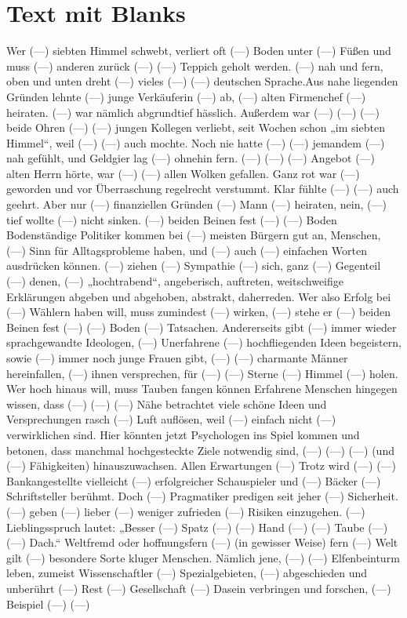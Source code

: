 \documentclass[14pt,a4paper]{extarticle}
\begin{document}
\section{Text mit Blanks}Wer (---) siebten Himmel schwebt, verliert oft (---) Boden unter (---) Füßen und muss (---) anderen zurück (---) (---) Teppich geholt werden. (---) nah und fern, oben und unten dreht (---) vieles (---) (---) deutschen Sprache.\newline\newline \newline\newline Aus nahe liegenden Gründen lehnte (---) junge Verkäuferin (---) ab, (---) alten Firmenchef (---) heiraten. (---) war nämlich abgrundtief hässlich. Außerdem war (---) (---) (---) beide Ohren (---) (---) jungen Kollegen verliebt, seit Wochen schon „im siebten Himmel“, weil (---) (---) auch mochte. Noch nie hatte (---) (---) jemandem (---) nah gefühlt, und Geldgier lag (---) ohnehin fern. (---) (---) (---) Angebot (---) alten Herrn hörte, war (---) (---) allen Wolken gefallen. Ganz rot war (---) geworden und vor Überraschung regelrecht verstummt. Klar fühlte (---) (---) auch geehrt. Aber nur (---) finanziellen Gründen (---) Mann (---) heiraten, nein, (---) tief wollte (---) nicht sinken.  (---) beiden Beinen fest (---) (---) Boden  Bodenständige Politiker kommen bei (---) meisten Bürgern gut an, Menschen, (---) Sinn für Alltagsprobleme haben, und (---) auch (---) einfachen Worten ausdrücken können. (---) ziehen (---) Sympathie (---) sich, ganz (---) Gegenteil (---) denen, (---) „hochtrabend“, angeberisch, auftreten, weitschweifige Erklärungen abgeben und abgehoben, abstrakt, daherreden. Wer also Erfolg bei (---) Wählern haben will, muss zumindest (---) wirken, (---) stehe er (---) beiden Beinen fest (---) (---) Boden (---) Tatsachen.  Andererseits gibt (---) immer wieder sprachgewandte Ideologen, (---) Unerfahrene (---) hochfliegenden Ideen begeistern, sowie (---) immer noch junge Frauen gibt, (---) (---) charmante Männer hereinfallen, (---) ihnen versprechen, für (---) (---) Sterne (---) Himmel (---) holen.  Wer hoch hinaus will, muss Tauben fangen können  Erfahrene Menschen hingegen wissen, dass (---) (---) (---) Nähe betrachtet viele schöne Ideen und Versprechungen rasch (---) Luft auflösen, weil (---) einfach nicht (---) verwirklichen sind. Hier könnten jetzt Psychologen ins Spiel kommen und betonen, dass manchmal hochgesteckte Ziele notwendig sind, (---) (---) (---) (und (---) Fähigkeiten) hinauszuwachsen.  Allen Erwartungen (---) Trotz wird (---) (---) Bankangestellte vielleicht (---) erfolgreicher Schauspieler und (---) Bäcker (---) Schriftsteller berühmt. Doch (---) Pragmatiker predigen seit jeher (---) Sicherheit. (---) geben (---) lieber (---) weniger zufrieden (---) Risiken einzugehen. (---) Lieblingsspruch lautet: „Besser (---) Spatz (---) (---) Hand (---) (---) Taube (---) (---) Dach.“  Weltfremd oder hoffnungsfern  (---) (in gewisser Weise) fern (---) Welt gilt (---) besondere Sorte kluger Menschen. Nämlich jene, (---) (---) Elfenbeinturm leben, zumeist Wissenschaftler (---) Spezialgebieten, (---) abgeschieden und unberührt (---) Rest (---) Gesellschaft (---) Dasein verbringen und forschen, (---) Beispiel (---) (---) 
\end{document}
